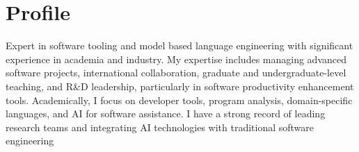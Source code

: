 \documentclass[10pt,a4paper,sans]{moderncv}
\begin{document}
\pagestyle{empty}
\makecvtitle

\section{Profile}

Expert in software tooling and model based language engineering with significant experience in academia and industry. My expertise includes managing advanced software projects, international collaboration, graduate and undergraduate-level teaching, and R\&D leadership, particularly in software productivity enhancement tools. Academically, I focus on developer tools, program analysis, domain-specific languages, and AI for software assistance. I have a strong record of leading research teams and integrating AI technologies with traditional software engineering
\end{document}
